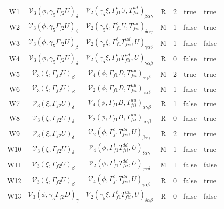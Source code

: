 \documentclass{article}[12pt]
\begin{document}
{
\begin{landscape}
\begin{tabular}{ c c c c c c c }
W1 & ${\mathcal V}_3(\phi,\gamma_5\Gamma_{f2}U)_{\delta}$  & ${\mathcal V}_2(\gamma_5\xi, \Gamma_{f1}^t U, T^{ud}_{fii})_{\beta\alpha\gamma}$  & R & 2 & true   & true \\
W2 & ${\mathcal V}_3(\phi,\gamma_5\Gamma_{f2}U)_{\beta}$   & ${\mathcal V}_2(\gamma_5\xi, \Gamma_{f1}^t U, T^{ud}_{fii})_{\delta\alpha\gamma}$ & M & 1 & false  & true \\
W3 & ${\mathcal V}_3(\phi,\gamma_5\Gamma_{f2}U)_{\beta}$   & ${\mathcal V}_2(\gamma_5\xi, \Gamma_{f1}^t T^{ud}_{fii}, U)_{\gamma\alpha\delta}$ & M & 1 & false  & false \\
W4 & ${\mathcal V}_3(\phi,\gamma_5\Gamma_{f2}U)_{\delta}$  & ${\mathcal V}_2(\gamma_5\xi, \Gamma_{f1}^t T^{ud}_{fii}, U)_{\gamma\alpha\beta}$  & R & 0 & false  & true \\
W5 & ${\mathcal V}_3(\xi,\Gamma_{f2}U)_{\beta}$   & ${\mathcal V}_4(\phi, \Gamma_{f1} D, T^{uu}_{fii})_{\alpha\gamma\delta}$   & M & 2 & true   & true \\
W6 & ${\mathcal V}_3(\xi,\Gamma_{f2}U)_{\beta}$   & ${\mathcal V}_2(\phi, \Gamma_{f1} D, T^{uu}_{fii})_{\gamma\alpha\delta}$   & M & 1 & false  & true \\
W7 & ${\mathcal V}_3(\xi,\Gamma_{f2}U)_{\delta}$  & ${\mathcal V}_4(\phi, \Gamma_{f1} D, T^{uu}_{fii})_{\alpha\gamma\beta}$    & R & 1 & false  & true \\
W8 & ${\mathcal V}_3(\xi,\Gamma_{f2}U)_{\delta}$  & ${\mathcal V}_2(\phi, \Gamma_{f1} D, T^{uu}_{fii})_{\gamma\alpha\beta}$    & R & 0 & false  & true \\
W9 & ${\mathcal V}_3(\xi,\Gamma_{f2}U)_{\delta}$  & ${\mathcal V}_2(\phi, \Gamma_{f1}^t T^{dd}_{fii}, U)_{\beta\alpha\gamma}$  & R & 2 & true   & true \\
W10& ${\mathcal V}_3(\xi,\Gamma_{f2}U)_{\delta}$  & ${\mathcal V}_4(\phi, \Gamma_{f1}^t T^{dd}_{fii}, U)_{\delta\alpha\gamma}$ & M & 1 & false  & true \\
W11& ${\mathcal V}_3(\xi,\Gamma_{f2}U)_{\beta}$   & ${\mathcal V}_2(\phi, \Gamma_{f1}^t T^{dd}_{fii}, U)_{\gamma\alpha\delta}$ & M & 1 & false  & false \\
W12& ${\mathcal V}_3(\xi,\Gamma_{f2}U)_{\beta}$   & ${\mathcal V}_4(\phi, \Gamma_{f1}^t T^{dd}_{fii}, U)_{\gamma\alpha\beta}$  & R & 0 & false  & true \\
W13& ${\mathcal V}_3(\phi,\gamma_5\Gamma_{f2}D)_{\gamma}$  & ${\mathcal V}_2(\gamma_5\xi, \Gamma_{f1}^t T^{uu}_{fii}, U)_{\delta\alpha\beta}$  & R & 0 & false  & false \\

\end{tabular}
\end{landscape}}
\end{document}
